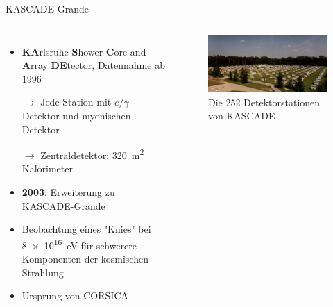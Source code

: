 \documentclass[aspectratio=1610, professionalfonts, 9pt, hyperref={colorlinks=false}]{beamer}
\begin{document}
\begin{frame}{KASCADE-Grande}
  \begin{columns}
      \begin{itemize}
        \setlength\itemsep{0.5em}
        \item \textbf{KA}rlsruhe \textbf{S}hower \textbf{C}ore and \textbf{A}rray \textbf{DE}tector, Datennahme ab 1996
        \item[$\rightarrow$] Jede Station mit $e/\gamma$-Detektor und myonischen Detektor
        \item[$\rightarrow$] Zentraldetektor: \SI{320}{\metre\squared} Kalorimeter
        \item \textbf{2003}: Erweiterung zu KASCADE-Grande
        \item Beobachtung eines "Knies" bei \SI{8e16}{\electronvolt} für schwerere Komponenten der kosmischen Strahlung
        \item Ursprung von CORSICA
      \end{itemize}
        \vspace*{10px}
  
      \begin{figure}
          \centering
          \includegraphics[width=\linewidth]{images/kascade.jpg}
          \caption{Die 252 Detektorstationen von KASCADE \cite{kascade}}
      \end{figure}
  \end{columns}
\end{frame}
\end{document}
